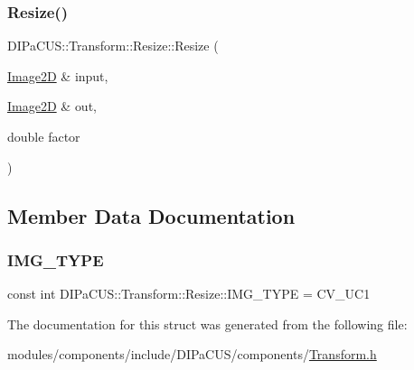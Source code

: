 \subsubsection{\texorpdfstring{Resize()}{Resize()}}
{\footnotesize\ttfamily D\+I\+Pa\+C\+U\+S\+::\+Transform\+::\+Resize\+::\+Resize (\begin{DoxyParamCaption}\item[{\mbox{\hyperlink{structDIPaCUS_1_1Transform_1_1Resize_a0e4548850b3aed5dd86283f0c4f38fee}{Image2D}} \&}]{input,  }\item[{\mbox{\hyperlink{structDIPaCUS_1_1Transform_1_1Resize_a0e4548850b3aed5dd86283f0c4f38fee}{Image2D}} \&}]{out,  }\item[{double}]{factor }\end{DoxyParamCaption})}



\subsection{Member Data Documentation}
\mbox{\label{structDIPaCUS_1_1Transform_1_1Resize_a94f6df88ddb94760235b92da8580b1d8}} 
\subsubsection{\texorpdfstring{I\+M\+G\+\_\+\+T\+Y\+PE}{IMG\_TYPE}}
{\footnotesize\ttfamily const int D\+I\+Pa\+C\+U\+S\+::\+Transform\+::\+Resize\+::\+I\+M\+G\+\_\+\+T\+Y\+PE = C\+V\+\_\+U\+C1}



The documentation for this struct was generated from the following file\+:\begin{DoxyCompactItemize}
\item 
modules/components/include/\+D\+I\+Pa\+C\+U\+S/components/\mbox{\hyperlink{Transform_8h}{Transform.\+h}}\end{DoxyCompactItemize}
